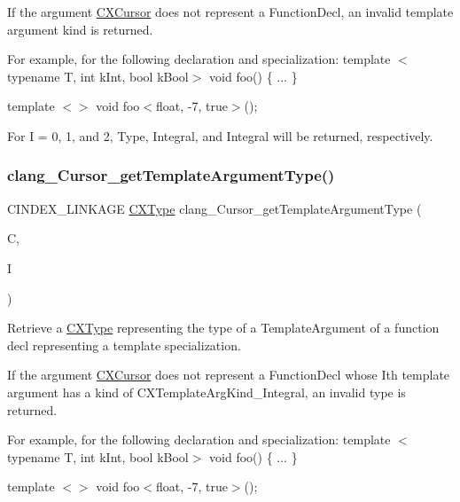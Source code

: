 If the argument \mbox{\hyperlink{structCXCursor}{C\+X\+Cursor}} does not represent a Function\+Decl, an invalid template argument kind is returned.

For example, for the following declaration and specialization\+: template $<$typename T, int k\+Int, bool k\+Bool$>$ void foo() \{ ... \}

template $<$$>$ void foo$<$float, -\/7, true$>$();

For I = 0, 1, and 2, Type, Integral, and Integral will be returned, respectively. \mbox{\label{group__CINDEX__TYPES_gae3fab0d8906e4531a1b7fbe77b4b4bc1}} 
\subsubsection{\texorpdfstring{clang\+\_\+\+Cursor\+\_\+get\+Template\+Argument\+Type()}{clang\_Cursor\_getTemplateArgumentType()}}
{\footnotesize\ttfamily C\+I\+N\+D\+E\+X\+\_\+\+L\+I\+N\+K\+A\+GE \mbox{\hyperlink{structCXType}{C\+X\+Type}} clang\+\_\+\+Cursor\+\_\+get\+Template\+Argument\+Type (\begin{DoxyParamCaption}\item[{\mbox{\hyperlink{structCXCursor}{C\+X\+Cursor}}}]{C,  }\item[{unsigned}]{I }\end{DoxyParamCaption})}



Retrieve a \mbox{\hyperlink{structCXType}{C\+X\+Type}} representing the type of a Template\+Argument of a function decl representing a template specialization. 

If the argument \mbox{\hyperlink{structCXCursor}{C\+X\+Cursor}} does not represent a Function\+Decl whose I\textquotesingle{}th template argument has a kind of C\+X\+Template\+Arg\+Kind\+\_\+\+Integral, an invalid type is returned.

For example, for the following declaration and specialization\+: template $<$typename T, int k\+Int, bool k\+Bool$>$ void foo() \{ ... \}

template $<$$>$ void foo$<$float, -\/7, true$>$();

